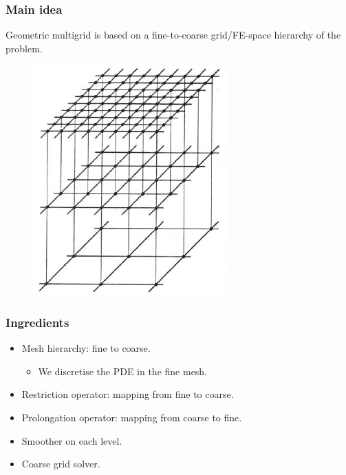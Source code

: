 \begin{frame}
\frametitle{Main idea}
Geometric multigrid is based on a fine-to-coarse grid/FE-space
hierarchy of the problem.
\begin{figure}
 \includegraphics[scale=0.45]{figures/grids}
\end{figure}

\end{frame}

\begin{frame}
\frametitle{Ingredients}
\begin{itemize}
  \item Mesh hierarchy: fine to coarse.
  \begin{itemize}
  	\item[\ding{224}] We discretise the PDE in the fine mesh.
  \end{itemize}

  \item Restriction operator: mapping from fine to coarse.
  \item Prolongation operator: mapping from coarse to fine.
  \item Smoother on each level.
  \item Coarse grid solver.
\end{itemize}

\end{frame}

